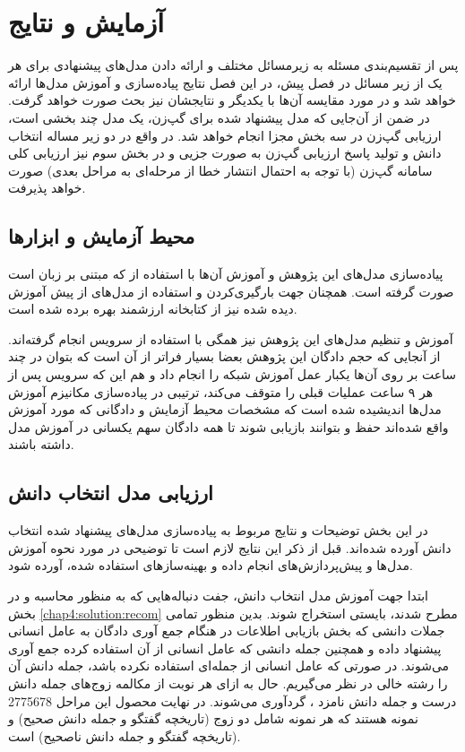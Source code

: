 \chapter{آزمایش و نتایج}\label{Chap5}
\minitoc

پس از تقسیم‌بندی مسئله به زیرمسائل مختلف و ارائه دادن مدل‌های پیشنهادی برای هر یک از زیر مسائل در فصل پیش، در این فصل نتایج پیاده‌سازی و آموزش مدل‌ها ارائه خواهد شد و در مورد مقایسه آن‌ها با یکدیگر و نتایجشان نیز بحث صورت خواهد گرفت. در ضمن از آن‌جایی که مدل پیشنهاد شده برای گپ‌زن، یک مدل چند بخشی است، ارزیابی گپ‌زن در سه بخش مجزا انجام خواهد شد. در واقع در دو زیر مساله انتخاب دانش و تولید پاسخ ارزیابی گپ‌زن به صورت جزیی و در بخش سوم نیز ارزیابی کلی سامانه گپ‌زن (با توجه به احتمال انتشار خطا از مرحله‌ای به مراحل بعدی) صورت خواهد پذیرفت.

\section{محیط آزمایش و ابزارها}

پیاده‌سازی مدل‌های این پژوهش و آموزش‌‌ ‌آن‌ها با استفاده از 
که مبتنی بر زبان
است صورت گرفته است. همچنان جهت بارگیری‌کردن و استفاده از مدل‌های از پیش آموزش دیده شده نیز از کتابخانه ارزشمند 
بهره برده شده است. 

آموزش و تنظیم‌ مدل‌های این پژوهش نیز همگی با استفاده از سرویس 
انجام گرفته‌اند. از آنجایی که حجم دادگان این پژوهش بعضا بسیار فراتر از آن است که بتوان در چند ساعت بر روی آن‌ها یکبار عمل آموزش شبکه را انجام داد و هم این که سرویس 
پس از هر ۹ ساعت عملیات قبلی را متوقف می‌کند،‌ ترتیبی در پیاده‌سازی مکانیزم آموزش مدل‌ها اندیشیده شده است که مشخصات محیط آزمایش و دادگانی که مورد آموزش واقع ‌شده‌اند حفظ و بتوانند بازیابی شوند تا همه دادگان سهم یکسانی در آموزش مدل داشته باشند. 



\section{ارزیابی مدل انتخاب دانش}

در این بخش توضیحات و نتایج مربوط به پیاده‌سازی مدل‌های پیشنهاد شده انتخاب دانش آورده شده‌اند. قبل از ذکر این نتایج لازم است تا توضیحی در مورد نحوه آموزش مدل‌ها و پیش‌پردازش‌های انجام داده و بهینه‌سازهای استفاده شده، آورده شود.

 ابتدا جهت آموزش مدل انتخاب دانش،‌ جفت دنباله‌هایی که به منظور محاسبه 
 و
 در بخش 
 \ref{chap4:solution:recom}
 مطرح شدند، بایستی استخراج شوند. بدین منظور تمامی جملات دانشی که بخش بازیابی اطلاعات در هنگام جمع آوری دادگان به عامل انسانی پیشنهاد داده و همچنین جمله دانشی که عامل انسانی از آن استفاده کرده جمع آوری می‌شوند. در صورتی که عامل انسانی از جمله‌ای استفاده نکرده باشد،‌ جمله دانش آن را رشته خالی در نظر می‌گیریم. حال به ازای هر نوبت از مکالمه زوج‌های جمله دانش درست و جمله دانش نامزد ، گردآوری می‌شوند. در نهایت محصول این مراحل 2775678 نمونه هستند که هر نمونه شامل دو زوج (تاریخچه گفتگو و جمله دانش صحیح) و (تاریخچه گفتگو و جمله دانش ناصحیح) است. 
 

